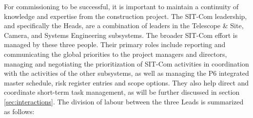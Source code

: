 \documentclass[SE,lsstdraft,authoryear,toc]{lsstdoc, lsstdraft}
\begin{document}
For commissioning to be successful, it is important to maintain a continuity of knowledge and expertise from the construction project.
The SIT-Com leadership, and specifically the Heads, are a combination of leaders in the Telescope \& Site, Camera, and Systems Engineering subsystems.
The broader SIT-Com effort is managed by these three people.
Their primary roles include reporting and communicating the global priorities to the project managers and directors, managing and negotiating the prioritization of SIT-Com activities in coordination with the activities of the other subsystems, as well as managing the P6 integrated master schedule, risk register entries and scope options.
They also help direct and coordinate short-term task management, as will be further discussed in section \ref{sec:interactions}.
The division of labour between the three Leads is summarized as follows:
\end{document}
